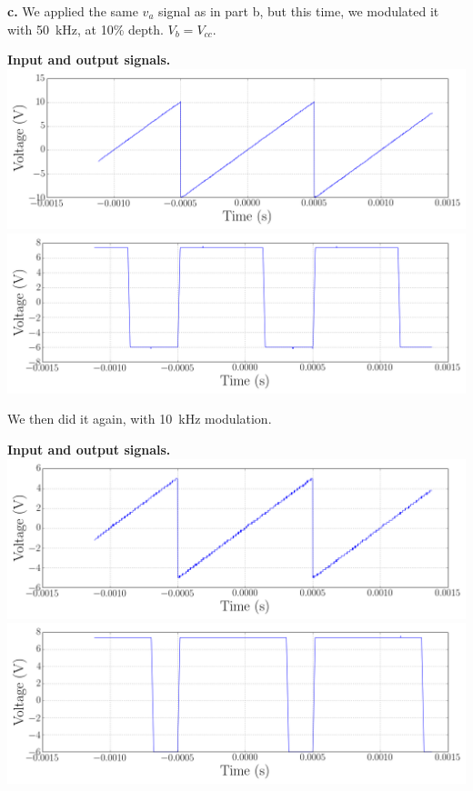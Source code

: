\documentclass{article}
\newenvironment{2colfig}{
  \par\medskip\noindent\minipage{\linewidth}
} {
  \endminipage\par\medskip
}
\begin{document}
\begin{multicols*}{2}
{\bf c.} We applied the same $v_a$ signal as in part b, but this time, we modulated it with \SI{50}{\kilo\hertz}, at
10\% depth. $V_b = V_{cc}$.

\begin{2colfig}
  \center
  {\bf Input and output signals.} \newline
  \includegraphics[scale=.22]{day1_lab8/ALL0001/F0001CH1}
  \includegraphics[scale=.22]{day1_lab8/ALL0001/F0001CH2}
  \label{fig:plot2}
\end{2colfig}

We then did it again, with \SI{10}{\kilo\hertz} modulation. 
\begin{2colfig}
  \center
  {\bf Input and output signals.} \newline
  \includegraphics[scale=.22]{day1_lab8/ALL0002/F0002CH1}
  \includegraphics[scale=.22]{day1_lab8/ALL0002/F0002CH2}
  \label{fig:plot3}
\end{2colfig}


\end{multicols*}
\end{document}
